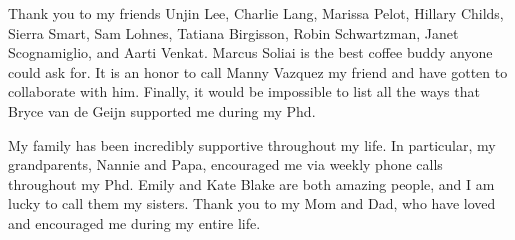Thank you to my friends Unjin Lee, Charlie Lang, Marissa Pelot, Hillary Childs, Sierra Smart, Sam Lohnes, Tatiana Birgisson, Robin Schwartzman, Janet Scognamiglio, and Aarti Venkat. Marcus Soliai is the best coffee buddy anyone could ask for. It is an honor to call Manny Vazquez my friend and have gotten to collaborate with him. Finally, it would be impossible to list all the ways that Bryce van de Geijn supported me during my Phd. 


My family has been incredibly supportive throughout my life. In particular, my grandparents, Nannie and Papa, encouraged me via weekly phone calls throughout my Phd. Emily and Kate Blake are both amazing people, and I am lucky to call them my sisters.  Thank you to my Mom and Dad, who have loved and encouraged me during my entire life. 